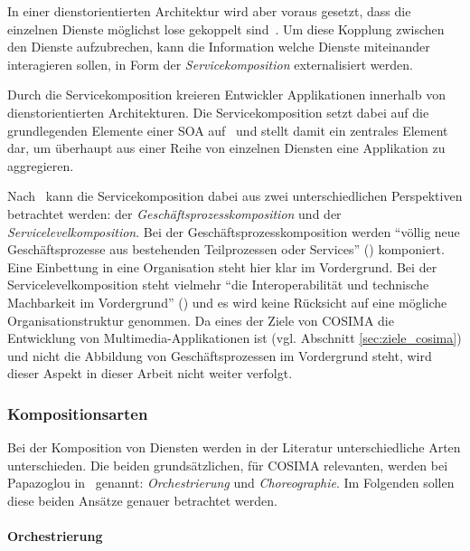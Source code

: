   In einer dienstorientierten Architektur wird aber voraus gesetzt, dass die einzelnen Dienste möglichst lose gekoppelt sind~\citep[S. 162]{soa_goes_real}. Um diese Kopplung zwischen den Dienste aufzubrechen, kann die Information welche Dienste miteinander interagieren sollen, in Form der \emph{Servicekomposition} externalisiert werden.

  Durch die Servicekomposition kreieren Entwickler Applikationen innerhalb von dienstorientierten Architekturen. Die Servicekomposition setzt dabei auf die grundlegenden Elemente einer SOA auf~\citep[S. 51]{milanovic2004csw} und stellt damit ein zentrales Element dar, um überhaupt aus einer Reihe von einzelnen Diensten eine Applikation zu aggregieren.
  
  Nach~\citep[S. 104]{masak2007ssb} kann die Servicekomposition dabei aus zwei unterschiedlichen Perspektiven betrachtet werden: der \emph{Geschäftsprozesskomposition} und der \emph{Servicelevelkomposition}. Bei der Geschäftsprozesskomposition werden "`völlig neue Geschäftsprozesse aus bestehenden Teilprozessen oder Services"' (\citep[S. 104]{masak2007ssb}) komponiert. Eine Einbettung in eine Organisation steht hier klar im Vordergrund. Bei der Servicelevelkomposition steht vielmehr "`die Interoperabilität und technische Machbarkeit im Vordergrund"' (\citep[S. 105]{masak2007ssb}) und es wird keine Rücksicht auf eine mögliche Organisationstruktur genommen. Da eines der Ziele von COSIMA die Entwicklung von Multimedia-Applikationen ist (vgl. Abschnitt \ref{sec:ziele_cosima}) und nicht die Abbildung von Geschäftsprozessen im Vordergrund steht, wird dieser Aspekt in dieser Arbeit nicht weiter verfolgt.
  
\subsubsection{Kompositionsarten} %
\label{ssub:kompositionsarten}

  Bei der Komposition von Diensten werden in der Literatur unterschiedliche Arten unterschieden. Die beiden grundsätzlichen, für COSIMA relevanten, werden bei Papazoglou in~\citep[S. 41]{papazoglou2007soc} genannt: \emph{Orchestrierung} und \emph{Choreographie}. Im Folgenden sollen diese beiden Ansätze genauer betrachtet werden.
  
\paragraph{Orchestrierung} %
\label{par:orchestrierung}
  
